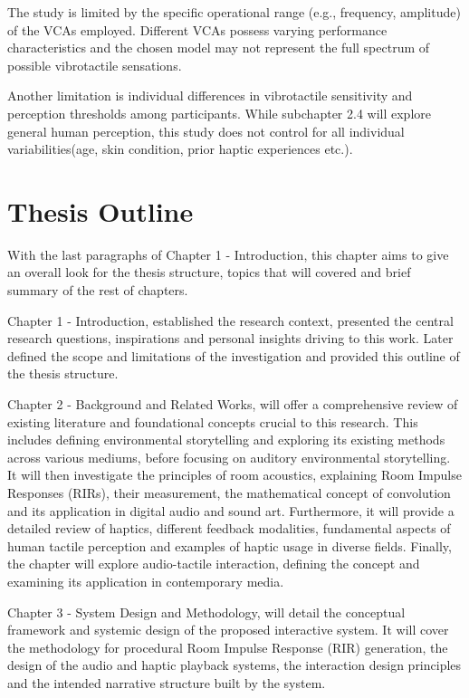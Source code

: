     The study is limited by the specific operational range (e.g., frequency, amplitude) of the VCAs employed. Different VCAs possess varying performance characteristics and the chosen model may not represent the full spectrum of possible vibrotactile sensations.\par

    Another limitation is individual differences in vibrotactile sensitivity and perception thresholds among participants. While subchapter 2.4 will explore general human perception, this study does not control for all individual variabilities(age, skin condition, prior haptic experiences etc.).\par
    \section{Thesis Outline}
    With the last paragraphs of Chapter 1 - Introduction, this chapter aims to give an overall look for the thesis structure, topics that will covered and brief summary of the rest of chapters.\par

    Chapter 1 - Introduction, established the research context, presented the central research questions, inspirations and personal insights driving to this work. Later defined the scope and limitations of the investigation and provided this outline of the thesis structure.\par

    Chapter 2 - Background and Related Works, will offer a comprehensive review of existing literature and foundational concepts crucial to this research. This includes defining environmental storytelling and exploring its existing methods across various mediums, before focusing on auditory environmental storytelling. It will then investigate the principles of room acoustics, explaining Room Impulse Responses (RIRs), their measurement, the mathematical concept of convolution and its application in digital audio and sound art. Furthermore, it will provide a detailed review of haptics, different feedback modalities, fundamental aspects of human tactile perception and examples of haptic usage in diverse fields. Finally, the chapter will explore audio-tactile interaction, defining the concept and examining its application in contemporary media.\par

    Chapter 3 - System Design and Methodology, will detail the conceptual framework and systemic design of the proposed interactive system. It will cover the methodology for procedural Room Impulse Response (RIR) generation, the design of the audio and haptic playback systems, the interaction design principles and the intended narrative structure built by the system.\par

